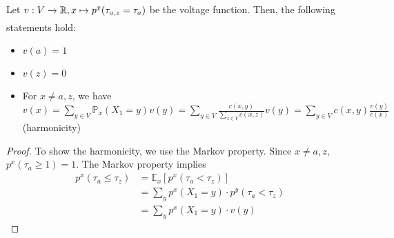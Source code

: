 \begin{lem}
  Let $v: V \myxrightarrow[]{} \mathbb{R}, x \mapsto p^x(\tau_{a,z}=\tau_a)$ be the voltage function. Then, the following statements hold:
  \begin{itemize}
      \item \(v(a)=1\)
      \item \(v(z)=0\)
      \item For $x\neq a,z$, we have \(v(x) = \sum_{y\in V}^{} \mathbb{P}_x(X_1=y) v(y) = \sum_{y\in V}^{} \frac{c(x,y)}{\sum_{z\in V} c(x,z) }v(y) = \sum_{y\in V}^{} c(x,y) \frac{v(y)}{c(x)}\) (harmonicity)
  \end{itemize}
\end{lem}
\begin{proof}
    To show the harmonicity, we use the Markov property. Since \(x \neq a,z\), \(p^x(\tau_a\geq 1)=1\). The Markov property implies 
    \begin{align*}
      p^x(\tau_a \leq \tau_z) &= \mathbb{E}_x \left[ p^x(\tau_a < \tau_z)\right] \\
                              &= \sum_y p^x(X_1=y)\cdot p^y(\tau_a < \tau_z) \\
                              &= \sum_y p^x(X_1=y) \cdot v(y)
    \end{align*}    
\end{proof}

